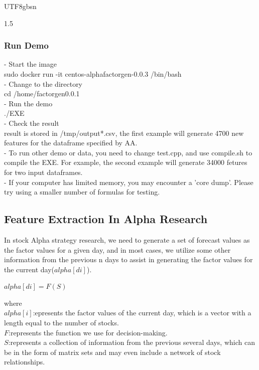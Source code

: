 \documentclass{article}
\begin{document}
\begin{CJK}{UTF8}{gbsn}
\begin{spacing}{1.5}
\subsubsection{Run Demo}
- Start the image \\
sudo docker run -it centos-alphafactorgen-0.0.3 /bin/bash\\
- Change to the directory\\
cd /home/factorgen0.0.1\\
- Run the demo\\
./EXE \\
- Check the result\\
result is stored in /tmp/output*.csv, the first example will generate 4700 new features for the dataframe specified by AA.\\
- To run other demo or data, you need to change test.cpp, and use compile.sh to compile the EXE. For example, the second example will generate 34000 fetures for two input dataframes. \\
- If your computer has limited memory, you may encounter a 'core dump'. Please try using a smaller number of formulas for testing. \\







\subsection{Feature Extraction In Alpha Research}


In stock Alpha strategy research, we need to generate a set of forecast values as the factor values for a given day, and in most cases, we utilize some other information from the previous n days to assist in generating the factor values for the current day($alpha[di]$).\\
  \centerline{$alpha[di] = F(S)$}
where  \\
$alpha[i]$:epresents the factor values of the current day, which is a vector with a length equal to the number of stocks.\\
$F$:represents the function we use for decision-making.  \\
$S$:represents a collection of information from the previous several days, which can be in the form of matrix sets and may even include a network of stock relationships.\\


\end{spacing}
\end{CJK}
\end{document}
